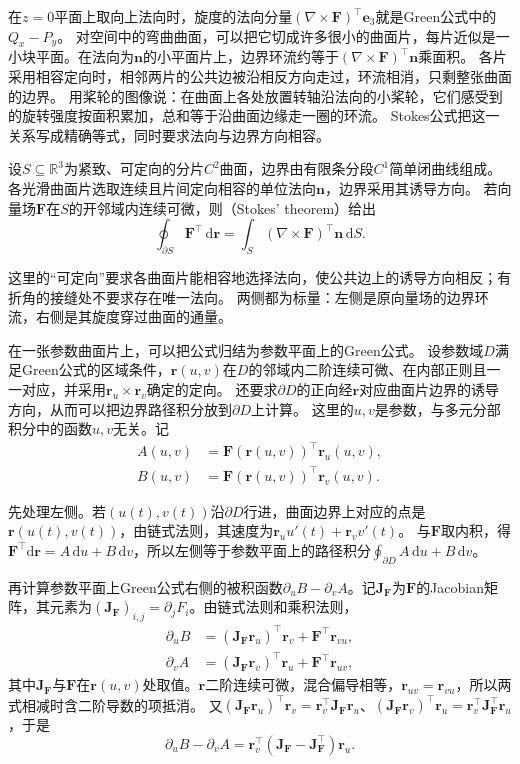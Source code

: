 在$z=0$平面上取向上法向时，旋度的法向分量$(\nabla\times\bm F)^\top\bm e_3$就是Green公式中的$Q_x-P_y$。
对空间中的弯曲曲面，可以把它切成许多很小的曲面片，每片近似是一小块平面。在法向为$\bm n$的小平面片上，边界环流约等于$(\nabla\times\bm F)^\top\bm n$乘面积。
各片采用相容定向时，相邻两片的公共边被沿相反方向走过，环流相消，只剩整张曲面的边界。
用桨轮的图像说：在曲面上各处放置转轴沿法向的小桨轮，它们感受到的旋转强度按面积累加，总和等于沿曲面边缘走一圈的环流。
Stokes公式把这一关系写成精确等式，同时要求法向与边界方向相容。
\begin{theorem}[Stokes定理]
\label{thm:multivariable-stokes}
设$S\subseteq\mathbb R^3$为紧致、可定向的分片$C^2$曲面，边界由有限条分段$C^1$简单闭曲线组成。
各光滑曲面片选取连续且片间定向相容的单位法向$\bm n$，边界采用其诱导方向。
若向量场$\bm F$在$S$的开邻域内连续可微，则（Stokes' theorem）给出
\begin{equation}
 \oint_{\partial S}\bm F^\top\,\mathrm d\bm r
 =\int_S(\nabla\times\bm F)^\top\bm n\,\mathrm dS.
 \label{eq:multivariable-stokes}
\end{equation}
\end{theorem}
这里的“可定向”要求各曲面片能相容地选择法向，使公共边上的诱导方向相反；有折角的接缝处不要求存在唯一法向。
两侧都为标量：左侧是原向量场的边界环流，右侧是其旋度穿过曲面的通量。

在一张参数曲面片上，可以把公式归结为参数平面上的Green公式。
设参数域$D$满足Green公式的区域条件，$\bm r(u,v)$在$D$的邻域内二阶连续可微、在内部正则且一一对应，并采用$\bm r_u\times\bm r_v$确定的定向。
还要求$\partial D$的正向经$\bm r$对应曲面片边界的诱导方向，从而可以把边界路径积分放到$\partial D$上计算。
这里的$u,v$是参数，与多元分部积分中的函数$u,v$无关。记
\[
 \begin{aligned}
 A(u,v)&=\bm F(\bm r(u,v))^\top\bm r_u(u,v),\\
 B(u,v)&=\bm F(\bm r(u,v))^\top\bm r_v(u,v).
 \end{aligned}
\]

先处理左侧。若$(u(t),v(t))$沿$\partial D$行进，曲面边界上对应的点是$\bm r(u(t),v(t))$，由链式法则，其速度为$\bm r_uu'(t)+\bm r_vv'(t)$。
与$\bm F$取内积，得$\bm F^\top\mathrm d\bm r=A\,\mathrm du+B\,\mathrm dv$，所以左侧等于参数平面上的路径积分$\oint_{\partial D}A\,\mathrm du+B\,\mathrm dv$。

再计算参数平面上Green公式右侧的被积函数$\partial_uB-\partial_vA$。记$\bm J_{\bm F}$为$\bm F$的Jacobian矩阵，其元素为$(\bm J_{\bm F})_{i,j}=\partial_jF_i$。由链式法则和乘积法则，
\[
 \begin{aligned}
 \partial_uB&=(\bm J_{\bm F}\bm r_u)^\top\bm r_v+\bm F^\top\bm r_{vu},\\
 \partial_vA&=(\bm J_{\bm F}\bm r_v)^\top\bm r_u+\bm F^\top\bm r_{uv},
 \end{aligned}
\]
其中$\bm J_{\bm F}$与$\bm F$在$\bm r(u,v)$处取值。$\bm r$二阶连续可微，混合偏导相等，$\bm r_{uv}=\bm r_{vu}$，所以两式相减时含二阶导数的项抵消。
又$(\bm J_{\bm F}\bm r_u)^\top\bm r_v=\bm r_v^\top\bm J_{\bm F}\bm r_u$、$(\bm J_{\bm F}\bm r_v)^\top\bm r_u=\bm r_v^\top\bm J_{\bm F}^\top\bm r_u$，于是
\[
 \partial_uB-\partial_vA=\bm r_v^\top(\bm J_{\bm F}-\bm J_{\bm F}^\top)\bm r_u.
\]

